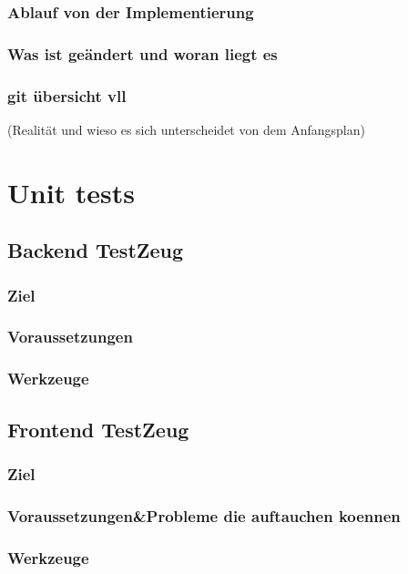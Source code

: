 \documentclass[parskip=full,11pt,twoside]{scrartcl}
\begin{document}
\subsubsection{Ablauf von der Implementierung}
\subsubsection{Was ist geändert und woran liegt es}
\subsubsection{git übersicht vll}
 (Realität und wieso es sich unterscheidet von dem Anfangsplan)
\pagebreak

\section{Unit tests}
\subsection{Backend TestZeug}
\subsubsection{Ziel}
\subsubsection{Voraussetzungen}
\subsubsection{Werkzeuge}
\subsection{Frontend TestZeug}
\subsubsection{Ziel}
\subsubsection{Voraussetzungen&Probleme die auftauchen koennen}
\subsubsection{Werkzeuge}
\pagebreak
\end{document}
